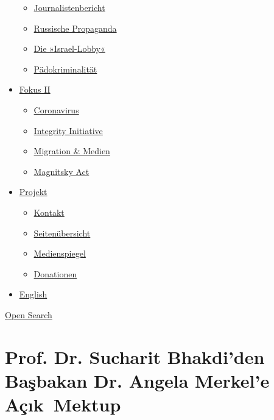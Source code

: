 \begin{itemize}
  \begin{itemize}
  \tightlist
  \item
    \href{https://swprs.org/bericht-eines-journalisten/}{Journalistenbericht}
  \item
    \href{https://swprs.org/russische-propaganda/}{Russische Propaganda}
  \item
    \href{https://swprs.org/die-israel-lobby-fakten-und-mythen/}{Die
    »Israel-Lobby«}
  \item
    \href{https://swprs.org/geopolitik-und-paedokriminalitaet/}{Pädokriminalität}
  \end{itemize}
\item
  \href{https://swprs.org/migration-und-medien/}{Fokus II}

  \begin{itemize}
  \tightlist
  \item
    \href{https://swprs.org/covid-19-hinweis-ii/}{Coronavirus}
  \item
    \href{https://swprs.org/die-integrity-initiative/}{Integrity
    Initiative}
  \item
    \href{https://swprs.org/migration-und-medien/}{Migration \& Medien}
  \item
    \href{https://swprs.org/der-fall-magnitsky/}{Magnitsky Act}
  \end{itemize}
\item
  \href{https://swprs.org/kontakt/}{Projekt}

  \begin{itemize}
  \tightlist
  \item
    \href{https://swprs.org/kontakt/}{Kontakt}
  \item
    \href{https://swprs.org/uebersicht/}{Seitenübersicht}
  \item
    \href{https://swprs.org/medienspiegel/}{Medienspiegel}
  \item
    \href{https://swprs.org/donationen/}{Donationen}
  \end{itemize}
\item
  \href{https://swprs.org/contact/}{English}
\end{itemize}

\protect\hyperlink{}{Open Search}

\hypertarget{prof-dr-sucharit-bhakdiden-baux15fbakan-dr-angela-merkele-auxe7ux131k-mektup}{%
\section{Prof. Dr. Sucharit Bhakdi'den Başbakan Dr. Angela Merkel'e
Açık~Mektup}\label{prof-dr-sucharit-bhakdiden-baux15fbakan-dr-angela-merkele-auxe7ux131k-mektup}}

